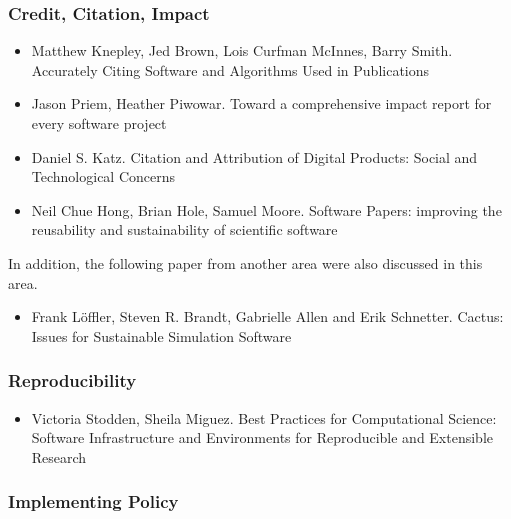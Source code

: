 \documentclass[11pt, oneside]{amsart}
\begin{document}
\subsubsection*{Credit, Citation, Impact}

\begin{itemize}

\item Matthew Knepley, Jed Brown, Lois Curfman McInnes, Barry Smith. Accurately Citing Software and Algorithms Used in Publications \cite{Knepley_WSSSPE}

\item Jason Priem, Heather Piwowar. Toward a comprehensive impact report for every software project \cite{Priem_WSSSPE}

\item Daniel S. Katz. Citation and Attribution of Digital Products: Social and Technological Concerns \cite{Katz2_WSSSPE}

\item Neil Chue Hong, Brian Hole, Samuel Moore. Software Papers: improving the reusability and sustainability of scientific software \cite{Chue_Hong_WSSSPE}

\end{itemize}

In addition, the following paper from another area were also discussed in this area.

\begin{itemize}

\item Frank Löffler, Steven R. Brandt, Gabrielle Allen and Erik Schnetter. Cactus: Issues for Sustainable Simulation Software \cite{Loffler_WSSSPE}

\end{itemize}

\subsubsection*{Reproducibility}

\begin{itemize}

\item Victoria Stodden, Sheila Miguez. Best Practices for Computational Science: Software Infrastructure and Environments for Reproducible and Extensible Research \cite{Stodden_WSSSPE}

\end{itemize}

\subsubsection*{Implementing Policy}
\end{document}
